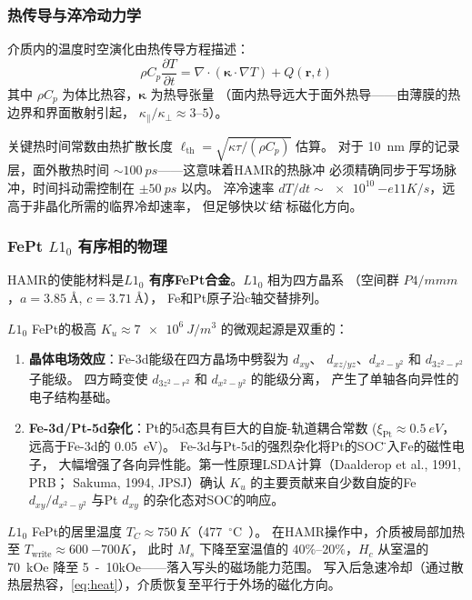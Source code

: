 \documentclass[11pt,a4paper,twoside]{article}
\newcommand{\degC}{\ensuremath{{}^{\circ}\mathrm{C}}}
\theoremstyle{definition}
\theoremstyle{plain}
\theoremstyle{remark}
\begin{document}
\subsubsection{热传导与淬冷动力学}

介质内的温度时空演化由热传导方程描述：
\begin{equation}\label{eq:heat}
  \rho C_p \frac{\partial T}{\partial t}
  = \nabla \cdot (\boldsymbol{\kappa} \cdot \nabla T) + Q(\mathbf{r}, t)
\end{equation}
其中 $\rho C_p$ 为体比热容，$\boldsymbol{\kappa}$ 为热导张量
（面内热导远大于面外热导——由薄膜的热边界和界面散射引起，
$\kappa_{\parallel} / \kappa_{\perp} \approx 3$--$5$）。

关键热时间常数由热扩散长度 $\ell_{\text{th}} = \sqrt{\kappa \tau / (\rho C_p)}$ 估算。
对于 \SI{10}{nm} 厚的记录层，面外散热时间 $\sim \SI{100}{ps}$——这意味着HAMR的热脉冲
必须精确同步于写场脉冲，时间抖动需控制在 $\pm\SI{50}{ps}$ 以内。
淬冷速率 $dT/dt \sim \SI{e10}{-e11}{K/s}$，远高于非晶化所需的临界冷却速率，
但足够快以\"冻结\"目标磁化方向。

\subsubsection{FePt $L1_0$ 有序相的物理}

HAMR的使能材料是\textbf{$L1_0$ 有序FePt合金}。$L1_0$ 相为四方晶系
（空间群 $P4/mmm$，$a = \SI{3.85}{\angstrom}$, $c = \SI{3.71}{\angstrom}$），
Fe和Pt原子沿c轴交替排列。

$L1_0$ FePt的极高 $K_u \approx \SI{7e6}{J/m^3}$ 的微观起源是双重的：
\begin{enumerate}
  \item \textbf{晶体电场效应}：Fe-3d能级在四方晶场中劈裂为 $d_{xy}$、
  $d_{xz/yz}$、$d_{x^2-y^2}$ 和 $d_{3z^2-r^2}$ 子能级。
  四方畸变使 $d_{3z^2-r^2}$ 和 $d_{x^2-y^2}$ 的能级分离，
  产生了单轴各向异性的电子结构基础。
  \item \textbf{Fe-3d/Pt-5d杂化}：Pt的5d态具有巨大的自旋-轨道耦合常数
  ($\xi_{\text{Pt}} \approx \SI{0.5}{eV}$，远高于Fe-3d的 \SI{0.05}{eV})。
  Fe-3d与Pt-5d的强烈杂化将Pt的SOC\"借入\"Fe的磁性电子，
  大幅增强了各向异性能。第一性原理LSDA计算（Daalderop et al., 1991, PRB；
  Sakuma, 1994, JPSJ）确认 $K_u$ 的主要贡献来自少数自旋的Fe $d_{xy}/d_{x^2-y^2}$
  与Pt $d_{xy}$ 的杂化态对SOC的响应。
\end{enumerate}

$L1_0$ FePt的居里温度 $T_C \approx \SI{750}{K}$（\SI{477}{\degC{}}）。
在HAMR操作中，介质被局部加热至 $T_{\text{write}} \approx \SI{600}{-700}{K}$，
此时 $M_s$ 下降至室温值的 $40\%$--$20\%$，$H_c$ 从室温的 \SI{70}{kOe}
降至 \SI{5}{-10}{kOe}——落入写头的磁场能力范围。
写入后急速冷却（通过散热层热容，\cref{eq:heat}），介质恢复至平行于外场的磁化方向。
\end{document}

